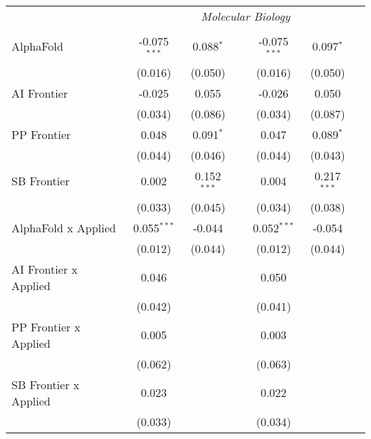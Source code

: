 \begin{tabular}{lcccccc}
 & \multicolumn{6}{c}{\textit{Molecular Biology}} \\ \\
   AlphaFold                    & -0.075$^{***}$ & 0.088$^{*}$   &               & -0.075$^{***}$ & 0.097$^{*}$   &   \\   
                                & (0.016)        & (0.050)       &               & (0.016)        & (0.050)       &   \\   
   AI Frontier                  & -0.025         & 0.055         &               & -0.026         & 0.050         &   \\   
                                & (0.034)        & (0.086)       &               & (0.034)        & (0.087)       &   \\   
   PP Frontier                  & 0.048          & 0.091$^{*}$   &               & 0.047          & 0.089$^{*}$   &   \\   
                                & (0.044)        & (0.046)       &               & (0.044)        & (0.043)       &   \\   
   SB Frontier                  & 0.002          & 0.152$^{***}$ &               & 0.004          & 0.217$^{***}$ &   \\   
                                & (0.033)        & (0.045)       &               & (0.034)        & (0.038)       &   \\   
   AlphaFold x Applied          & 0.055$^{***}$  & -0.044        &               & 0.052$^{***}$  & -0.054        &   \\   
                                & (0.012)        & (0.044)       &               & (0.012)        & (0.044)       &   \\   
   AI Frontier x Applied        & 0.046          &               &               & 0.050          &               &   \\   
                                & (0.042)        &               &               & (0.041)        &               &   \\   
   PP Frontier x Applied        & 0.005          &               &               & 0.003          &               &   \\   
                                & (0.062)        &               &               & (0.063)        &               &   \\   
   SB Frontier x Applied        & 0.023          &               &               & 0.022          &               &   \\   
                                & (0.033)        &               &               & (0.034)        &               &   \\   

\end{tabular}
